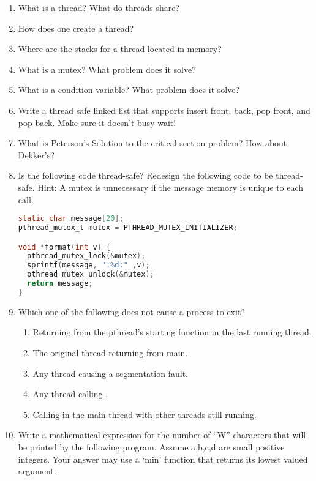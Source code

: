 \begin{enumerate}
\item What is a thread? What do threads share?
\item How does one create a thread?
\item Where are the stacks for a thread located in memory?
\item What is a mutex? What problem does it solve?
\item What is a condition variable? What problem does it solve?
\item Write a thread safe linked list that supports insert front, back, pop front, and pop back. Make sure it doesn't busy wait!
\item What is Peterson's Solution to the critical section problem? How about Dekker's?
\item Is the following code thread-safe? Redesign the following code to be thread-safe. Hint: A mutex is unnecessary if the message memory is unique to each call.

\begin{lstlisting}[language=C]
static char message[20];
pthread_mutex_t mutex = PTHREAD_MUTEX_INITIALIZER;

void *format(int v) {
  pthread_mutex_lock(&mutex);
  sprintf(message, ":%d:" ,v);
  pthread_mutex_unlock(&mutex);
  return message;
}
\end{lstlisting}

\item Which one of the following does not cause a process to exit?

\begin{enumerate}
\item Returning from the pthread's starting function in the last running thread.
\item The original thread returning from main.
\item Any thread causing a segmentation fault.
\item Any thread calling .
\item Calling  in the main thread with other threads still running.
\end{enumerate}

\item Write a mathematical expression for the number of ``W'' characters that will be printed by the following program. Assume a,b,c,d are small positive integers. Your answer may use a `min' function that returns its lowest valued argument.


\end{enumerate}
